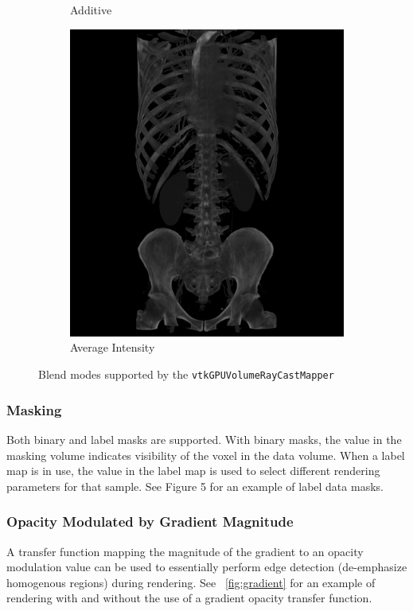 \begin{figure}[htbp]
\begin{subfigure}{.5\columnwidth}
    \caption{Additive}
    \label{fig:blendadditive}
  \end{subfigure}%
  \begin{subfigure}{.5\columnwidth}
    \includegraphics[width=\columnwidth]{TorsoBlendingAverage.png}
    \caption{Average Intensity}
    \label{fig:blendaverage}
  \end{subfigure}
  \caption{Blend modes supported by the \texttt{vtkGPUVolumeRayCastMapper}}
  \label{fig:blendingmodes}
\end{figure}

\subsubsection{Masking}
Both binary and label masks are supported. With binary masks, the value in the masking volume indicates visibility of the voxel in the data volume. When a label map is in use, the value in the label map is used to select different rendering parameters for that sample.  See Figure 5 for an example of label data masks.

\subsubsection{Opacity Modulated by Gradient Magnitude}
A transfer function mapping the magnitude of the gradient to an opacity modulation value can be used to essentially perform edge detection (de-emphasize homogenous regions) during rendering. See ~\ref{fig:gradient} for an example of rendering with and without the use of a gradient opacity transfer function.

